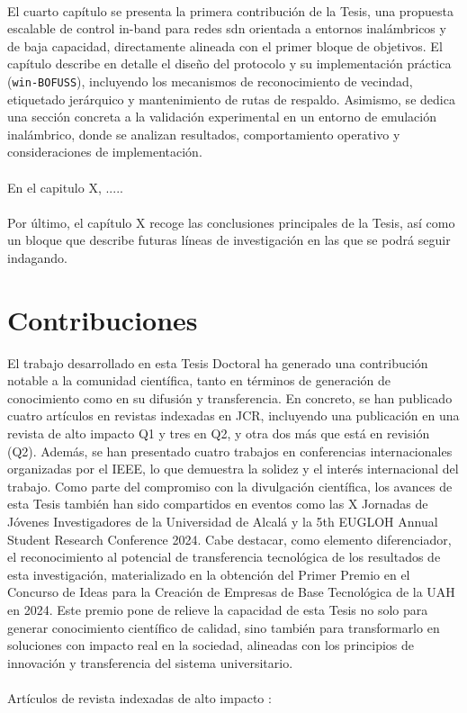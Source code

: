 \\
El cuarto capítulo se presenta la primera contribución de la Tesis, una propuesta escalable de control in-band para redes \gls{sdn} orientada a entornos inalámbricos y de baja capacidad, directamente alineada con el primer bloque de objetivos. El capítulo describe en detalle el diseño del protocolo y su implementación práctica (\texttt{win-BOFUSS}), incluyendo los mecanismos de reconocimiento de vecindad, etiquetado jerárquico y mantenimiento de rutas de respaldo. Asimismo, se dedica una sección concreta a la validación experimental en un entorno de emulación inalámbrico, donde se analizan resultados, comportamiento operativo y consideraciones de implementación.
\\
\\
En el capitulo X, .....\\
\\
Por último, el capítulo X recoge las conclusiones principales de la Tesis, así como un bloque que describe futuras líneas de investigación en las que se podrá seguir indagando.


\section{Contribuciones}

El trabajo desarrollado en esta Tesis Doctoral ha generado una contribución notable a la comunidad científica, tanto en términos de generación de conocimiento como en su difusión y transferencia. En concreto, se han publicado cuatro artículos en revistas indexadas en JCR, incluyendo una publicación en una revista de alto impacto Q1 y tres en Q2, y otra dos más que está en revisión (Q2). Además, se han presentado cuatro trabajos en conferencias internacionales organizadas por el IEEE, lo que demuestra la solidez y el interés internacional del trabajo. Como parte del compromiso con la divulgación científica, los avances de esta Tesis también han sido compartidos en eventos como las X Jornadas de Jóvenes Investigadores de la Universidad de Alcalá y la 5th EUGLOH Annual Student Research Conference 2024. Cabe destacar, como elemento diferenciador, el reconocimiento al potencial de transferencia tecnológica de los resultados de esta investigación, materializado en la obtención del Primer Premio en el Concurso de Ideas para la Creación de Empresas de Base Tecnológica de la UAH en 2024. Este premio pone de relieve la capacidad de esta Tesis no solo para generar conocimiento científico de calidad, sino también para transformarlo en soluciones con impacto real en la sociedad, alineadas con los principios de innovación y transferencia del sistema universitario.\\
\\
Artículos de revista indexadas de alto impacto :

